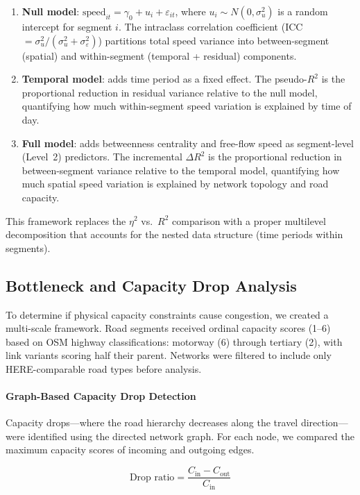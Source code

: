 \documentclass[12pt,a4paper]{article}
\begin{document}
\begin{enumerate}
  \item \textbf{Null model}: $\text{speed}_{it} = \gamma_0 + u_i + \varepsilon_{it}$, where $u_i \sim N(0, \sigma^2_u)$ is a random intercept for segment $i$. The intraclass correlation coefficient (ICC $= \sigma^2_u / (\sigma^2_u + \sigma^2_\varepsilon)$) partitions total speed variance into between-segment (spatial) and within-segment (temporal + residual) components.
  \item \textbf{Temporal model}: adds time period as a fixed effect. The pseudo-$R^2$ is the proportional reduction in residual variance relative to the null model, quantifying how much within-segment speed variation is explained by time of day.
  \item \textbf{Full model}: adds betweenness centrality and free-flow speed as segment-level (Level~2) predictors. The incremental $\Delta R^2$ is the proportional reduction in between-segment variance relative to the temporal model, quantifying how much spatial speed variation is explained by network topology and road capacity.
\end{enumerate}

This framework replaces the $\eta^2$ vs.\ $R^2$ comparison with a proper multilevel decomposition that accounts for the nested data structure (time periods within segments).

\subsection{Bottleneck and Capacity Drop Analysis}

To determine if physical capacity constraints cause congestion, we created a multi-scale framework. Road segments received ordinal capacity scores (1--6) based on OSM highway classifications: motorway (6) through tertiary (2), with link variants scoring half their parent. Networks were filtered to include only HERE-comparable road types before analysis.

\paragraph{Graph-Based Capacity Drop Detection}

Capacity drops---where the road hierarchy decreases along the travel direction---were identified using the directed network graph. For each node, we compared the maximum capacity scores of incoming and outgoing edges.

\[\text{Drop ratio} = \frac{C_{\text{in}} - C_{\text{out}}}{C_{\text{in}}}\]
\end{document}
